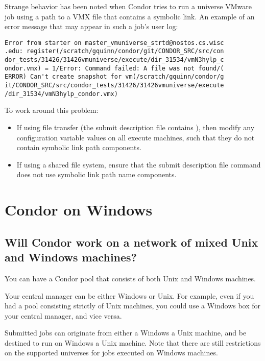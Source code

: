 Strange behavior has been noted when Condor tries to run a 
 universe VMware
job using a path to a VMX file that contains a symbolic link.
An example of an error message that may appear in such a job's user log:
\begin{verbatim}
Error from starter on master_vmuniverse_strtd@nostos.cs.wisc
.edu: register(/scratch/gquinn/condor/git/CONDOR_SRC/src/con
dor_tests/31426/31426vmuniverse/execute/dir_31534/vmN3hylp_c
ondor.vmx) = 1/Error: Command failed: A file was not found/(
ERROR) Can't create snapshot for vm(/scratch/gquinn/condor/g
it/CONDOR_SRC/src/condor_tests/31426/31426vmuniverse/execute
/dir_31534/vmN3hylp_condor.vmx)
\end{verbatim}
To work around this problem:
\begin{itemize}
\item If using file transfer
(the submit description file contains
),
then modify any
configuration variable  values on all execute machines,
such that they do not contain symbolic link path components.
\item If using a shared file system, ensure that the
submit description file command
 does not use
symbolic link path name components.
\end{itemize}

\section{Condor on Windows}

\subsection*{Will Condor work on a network of mixed Unix and Windows machines?}

You can have a Condor pool that consists of both Unix and Windows machines.

Your central manager can be either Windows or Unix.  For example,
even if you had a pool consisting strictly of Unix machines, you could
use a Windows box for your central manager, and vice versa.

Submitted jobs can originate from either a 
Windows  a Unix machine,
and be destined to run on Windows
 a Unix machine.
Note that there are still restrictions on the supported universes
for jobs executed on Windows machines.

